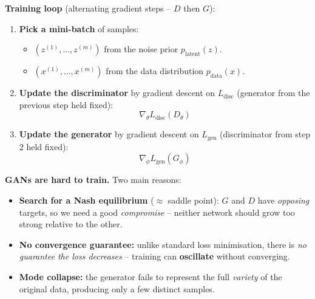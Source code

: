 \documentclass[10pt,a4paper]{article}
\begin{document}
	\medskip
	\textbf{Training loop} (alternating gradient steps -- $D$ then $G$):
	\begin{enumerate}[leftmargin=*]
		\item \textbf{Pick a mini-batch} of samples:
		\begin{itemize}
			\item $(z^{(1)},\dots,z^{(m)})$ from the noise prior $p_{\text{latent}}(z)$.
			\item $(x^{(1)},\dots,x^{(m)})$ from the data distribution $p_{\text{data}}(x)$.
		\end{itemize}
		\item \textbf{Update the discriminator} by gradient descent on $L_{\text{disc}}$ (generator from the previous step held fixed):
		\[ \nabla_\theta L_{\text{disc}}(D_\theta) \]
		\item \textbf{Update the generator} by gradient descent on $L_{\text{gen}}$ (discriminator from step 2 held fixed):
		\[ \nabla_\phi L_{\text{gen}}(G_\phi) \]
	\end{enumerate}

	\begin{importantbox}
		\textbf{GANs are hard to train.} Two main reasons:
		\begin{itemize}
			\item \textbf{Search for a Nash equilibrium} ($\approx$ saddle point): $G$ and $D$ have \emph{opposing} targets, so we need a good \emph{compromise} -- neither network should grow too strong relative to the other.
			\item \textbf{No convergence guarantee:} unlike standard loss minimisation, there is \emph{no guarantee the loss decreases} -- training can \textbf{oscillate} without converging.
			\item \textbf{Mode collapse:} the generator fails to represent the full \emph{variety} of the original data, producing only a few distinct samples.
		\end{itemize}
	\end{importantbox}
\end{document}
